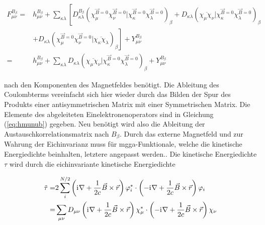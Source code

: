     \begin{equation}
    \begin{aligned}
    F_{\mu\nu}^{B_\beta}=&h_{\mu\nu}^{B_\beta}+\sum_{\kappa\lambda}\left[D_{\kappa\lambda}^{B_\beta}\left(\chi_\mu^{\vec{B}=0}\chi_\nu^{\vec{B}=0}\vert\chi_\kappa^{\vec{B}=0}\chi_\lambda^{\vec{B}=0}\right)_{\beta}+D_{\kappa\lambda}\left(\overline{\chi_\mu\chi_\nu}\vert\chi_\kappa^{\vec{B}=0}\chi_\lambda^{\vec{B}=0}\right)_{\beta}\right.\\
    &+\left.D_{\kappa\lambda}\left(\chi_\mu^{\vec{B}=0}\chi_\nu^{\vec{B}=0}\vert\overline{\chi_\kappa\chi_\lambda}\right)_{\beta}\right]+Y_{\mu\nu}^{B_\beta}\\
    =&h_{\mu\nu}^{B_\beta}+\sum_{\kappa\lambda}D_{\kappa\lambda}\left(\overline{\chi_\mu\chi_\nu}\vert\chi_\kappa^{\vec{B}=0}\chi_\lambda^{\vec{B}=0}\right)_{\beta}+Y_{\mu\nu}^{B_\beta}
    \end{aligned}
    \end{equation}

nach den Komponenten des Magnetfeldes benötigt. Die Ableitung des Coulombterms vereinfacht sich hier wieder durch das Bilden der Spur des Produkts einer antisymmetrischen Matrix mit einer Symmetrischen Matrix. Die Elemente des abgeleiteten Einelektronenoperators sind in Gleichung (\ref{eq:hmunub}) gegeben. Neu benötigt wird also die Ableitung der Austauschkorrelationsmatrix nach $B_\beta$. Durch das externe Magnetfeld und zur Wahrung der Eichinvarianz muss für \ac{mgga}-Funktionale, welche die kinetische Energiedichte beinhalten, letztere angepasst werden.\supercite{maximoff2004nuclear}. Die kinetische Energiedichte $\tau$ wird durch die eichinvariante kinetische Energiedichte 

\begin{equation}
\begin{aligned}
\tilde{\tau}=&2\sum_i^{N/2}\left(\mathrm{i}\mkern1mu\nabla +\frac{1}{2c}\vec{B}\times\vec{r}\right)\varphi_i^*\cdot\left(-\mathrm{i}\mkern1mu\nabla+\frac{1}{2c}\vec{B}\times\vec{r}\right)\varphi_i\\
=&\sum_{\mu\nu}D_{\mu\nu}\left(\mathrm{i}\mkern1mu\nabla +\frac{1}{2c}\vec{B}\times\vec{r}\right)\chi_\mu^*\cdot\left(-\mathrm{i}\mkern1mu\nabla+\frac{1}{2c}\vec{B}\times\vec{r}\right)\chi_\nu
\end{aligned}
\end{equation}

